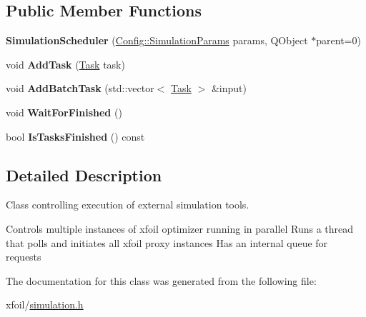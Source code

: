 \subsection*{Public Member Functions}
\begin{DoxyCompactItemize}
\item 
\hypertarget{class_simulation_scheduler_aa0e08acf06360d47589272e592d031b7}{}\label{class_simulation_scheduler_aa0e08acf06360d47589272e592d031b7} 
{\bfseries Simulation\+Scheduler} (\hyperlink{struct_config_1_1_simulation_params}{Config\+::\+Simulation\+Params} params, Q\+Object $\ast$parent=0)
\item 
\hypertarget{class_simulation_scheduler_a2090cc903dea412d1c49dbc6c2bac8c5}{}\label{class_simulation_scheduler_a2090cc903dea412d1c49dbc6c2bac8c5} 
void {\bfseries Add\+Task} (\hyperlink{struct_task}{Task} task)
\item 
\hypertarget{class_simulation_scheduler_afb3ac15bf8920c5cf02da1987c48736a}{}\label{class_simulation_scheduler_afb3ac15bf8920c5cf02da1987c48736a} 
void {\bfseries Add\+Batch\+Task} (std\+::vector$<$ \hyperlink{struct_task}{Task} $>$ \&input)
\item 
\hypertarget{class_simulation_scheduler_aa8bbd350d4174bf069f5466abc33db6e}{}\label{class_simulation_scheduler_aa8bbd350d4174bf069f5466abc33db6e} 
void {\bfseries Wait\+For\+Finished} ()
\item 
\hypertarget{class_simulation_scheduler_a21b6811560eafda46f85ffdee02bcbb2}{}\label{class_simulation_scheduler_a21b6811560eafda46f85ffdee02bcbb2} 
bool {\bfseries Is\+Tasks\+Finished} () const
\end{DoxyCompactItemize}


\subsection{Detailed Description}
Class controlling execution of external simulation tools. 

Controls multiple instances of xfoil optimizer running in parallel Runs a thread that polls and initiates all xfoil proxy instances Has an internal queue for requests 

The documentation for this class was generated from the following file\+:\begin{DoxyCompactItemize}
\item 
xfoil/\hyperlink{simulation_8h}{simulation.\+h}\end{DoxyCompactItemize}
